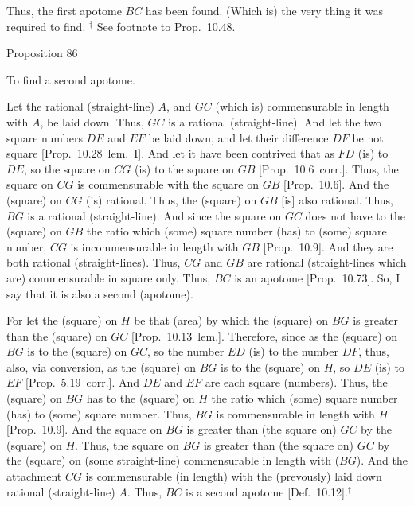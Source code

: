 Thus, the first apotome $BC$ has been found. (Which is) the
very thing it was required to find.
{\footnotesize\noindent$^\dag$ See footnote to Prop.~10.48.}


\begin{center}
{\large Proposition 86}
\end{center}\vspace*{-7pt}

To find a second apotome.

Let the rational (straight-line) $A$, and $GC$ (which is)
commensurable in length with $A$, be laid down. Thus, $GC$ is a rational (straight-line).
And let the two square numbers $DE$ and $EF$ be laid down, and let
their
difference $DF$ be not square [Prop.~10.28~lem.~I]. 
And let it have been contrived that as $FD$ (is) to $DE$, so the square on $CG$ (is) to the square on $GB$ [Prop.~10.6~corr.].
Thus, the square on $CG$ is commensurable with the square on $GB$ [Prop.~10.6]. And the (square) on $CG$ (is) rational.
Thus, the (square) on $GB$ [is] also rational. Thus, $BG$ is a rational
(straight-line).  And since the square on $GC$ does not have to the
(square) on $GB$ the ratio which (some) square number (has) to
(some) square number, $CG$ is incommensurable in length with $GB$
[Prop.~10.9]. And they are both rational (straight-lines). Thus, $CG$ and $GB$ are rational (straight-lines which are)
commensurable in square only. Thus, $BC$ is an apotome [Prop.~10.73]. So, I say that it is also a second
(apotome).

\epsfysize=0.65in
\centerline{}

For let the (square) on $H$ be that (area) by which the (square) on $BG$
is greater than the (square) on $GC$ [Prop.~10.13~lem.]. Therefore, since
as the (square) on $BG$ is to the (square) on $GC$, so the number $ED$
(is) to the number $DF$, thus, also, via conversion, as the (square) on $BG$
is to the (square) on $H$, so $DE$ (is) to $EF$ [Prop.~5.19~corr.]. And $DE$ and $EF$ are each
square (numbers). Thus, the (square) on $BG$ has to the (square)
on $H$ the ratio which (some) square number (has) to (some) square number.
Thus, $BG$ is commensurable in length with $H$ [Prop.~10.9]. 
And the square on $BG$ is greater than (the square on) $GC$ by the (square)
on $H$.
Thus, the square on $BG$ is greater
than (the square on) $GC$ by the (square) on (some straight-line)
commensurable in length with ($BG$). And the attachment $CG$
is commensurable (in length) with the (prevously) laid down rational (straight-line) $A$.
Thus, $BC$ is a second apotome [Def.~10.12].$^\dag$

